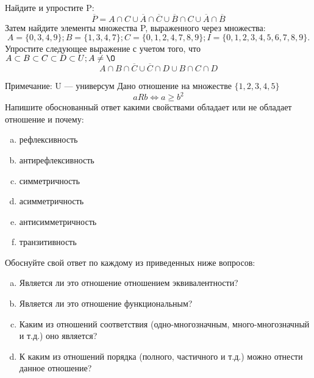 \documentclass[10pt]{exam}
\begin{document}
\begin{questions}
\question
Найдите и упростите P:
\begin{equation*}
\overline{P} = A \cap C \cup \overline{A} \cap \overline{C} \cup \overline{B} \cap C \cup \overline{A} \cap \overline{B}
\end{equation*}
Затем найдите элементы множества P, выраженного через множества:
\begin{equation*}
A = \{0, 3, 4, 9\}; 
B = \{1, 3, 4, 7\};
C = \{0, 1, 2, 4, 7, 8, 9\};
I = \{0, 1, 2, 3, 4, 5, 6, 7, 8, 9\}.
\end{equation*}\question
Упростите следующее выражение с учетом того, что $A\subset B \subset C \subset D \subset U; A \neq \O$
\begin{equation*}
A \cap B  \cap \overline{C} \cup \overline{C} \cap D \cup B \cap C \cap D
\end{equation*}

Примечание: U — универсум\question
Дано отношение на множестве $\{1, 2, 3, 4, 5\}$ 
\begin{equation*}
aRb \iff a \geq b^2
\end{equation*}
Напишите обоснованный ответ какими свойствами обладает или не обладает отношение и почему:   
\begin{enumerate} [a)]\setcounter{enumi}{0}
\item рефлексивность
\item антирефлексивность
\item симметричность
\item асимметричность
\item антисимметричность
\item транзитивность
\end{enumerate}

Обоснуйте свой ответ по каждому из приведенных ниже вопросов:
\begin{enumerate} [a)]\setcounter{enumi}{0}
    \item Является ли это отношение отношением эквивалентности?
    \item Является ли это отношение функциональным?
    \item Каким из отношений соответствия (одно-многозначным, много-многозначный и т.д.) оно является?
    \item К каким из отношений порядка (полного, частичного и т.д.) можно отнести данное отношение?
\end{enumerate}



\end{questions}
\end{document}
